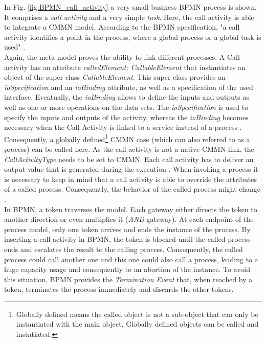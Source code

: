 In Fig. \ref{fig:BPMN_call_activity} a very small business BPMN process is shown. It comprises a \textit{call activity} and a very simple \textit{task}. Here, the call activity is able to integrate a CMMN model. According to the BPMN specification, "a call activity identifies a point in the process, where a global process or a global task is used" \cite{BPMNspec}. \\
Again, the meta model proves the ability to link different processes. A Call activity has an attribute \textit{calledElement: CallableElement} that instantiates an object of the super class \textit{CallableElement}. This super class provides an \textit{ioSpecification} and an \textit{ioBinding} attribute, as well as a specification of the used interface. Eventually, the \textit{ioBinding} allows to define the inputs and outputs as well as one or more operations on the data sets. The \textit{ioSpecification} is used to specify the inputs and outputs of the activity, whereas the \textit{ioBinding} becomes necessary when the Call Activity is linked to a service instead of a process \cite{BPMNspec}.
Consequently, a globally defined\footnote{Globally defined means the called object is not a sub-object that can only be instantiated with the main object. Globally defined objects can be called and instatiated.} CMMN case (which can also referred to as a process) can be called here. As the call activity is not a native CMMN-link, the \textit{CallActivityType} needs to be set to CMMN. Each call activity has to deliver an output value that is generated during the execution \cite{BPMNspec}. When invoking a process it is necessary to keep in mind that a call activity is able to override the attributes of a called process. Consequently, the behavior of the called process might change \cite{BPMNspec}.\\

In BPMN, a token traverses the model. Each gateway either directs the token to another direction or even multiplies it (\textit{AND} gateway). At each endpoint of the process model, only one token arrives and ends the instance of the process. By inserting a call activity in BPMN, the token is blocked until the called process ends and escalates the result to the calling process. Consequently, the called process could call another one and this one could also call a process, leading to a huge capacity usage and consequently to an abortion of the instance. To avoid this situation, BPMN provides the \textit{Termination Event} that, when reached by a token, terminates the process immediately and discards the other tokens.

